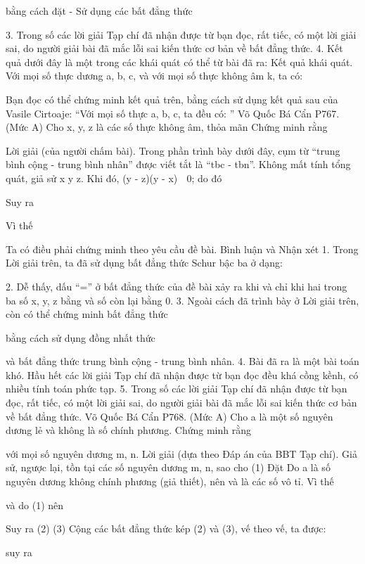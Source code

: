 \begin{multicols}{2}
	bằng cách đặt      
	- Sử dụng các bất đẳng thức
	
	
	3. Trong số các lời giải Tạp chí đã nhận được từ bạn đọc, rất tiếc, có một lời giải sai, do người giải bài đã mắc lỗi sai kiến thức cơ bản về bất đẳng thức.
	4. Kết quả dưới đây là một trong các khái quát có thể từ bài đã ra:
	Kết quả khái quát. Với mọi số thực dương a, b, c, và với mọi số thực không âm k, ta có:
	
	Bạn đọc có thể chứng minh kết quả trên, bằng cách sử dụng kết quả sau của Vasile Cirtoaje:
	“Với mọi số thực a, b, c, ta đều có:
	”
	Võ Quốc Bá Cẩn
	P767. (Mức A) Cho x, y, z là các số thực không âm, thỏa mãn   Chứng minh rằng
	
	Lời giải (của người chấm bài).
	Trong phần trình bày dưới đây, cụm từ “trung bình cộng - trung bình nhân” được viết tắt là “tbc - tbn”.
	Không mất tính tổng quát, giả sử x \ge y \ge z.
	Khi đó, (y - z)(y - x)  0; do đó
	
	Suy ra
	
	Vì thế
	
	Ta có điều phải chứng minh theo yêu cầu đề bài.
	Bình luận và Nhận xét
	1. Trong Lời giải trên, ta đã sử dụng bất đẳng thức Schur bậc ba ở dạng:
	
	2. Dễ thấy, dấu “=” ở bất đẳng thức của đề bài xảy ra khi và chỉ khi hai trong ba số x, y, z bằng   và số còn lại bằng 0.
	3. Ngoài cách đã trình bày ở Lời giải trên, còn có thể chứng minh bất đẳng thức
	
	bằng cách sử dụng đồng nhất thức
	
	và bất đẳng thức trung bình cộng - trung bình nhân.
	4. Bài đã ra là một bài toán khó. Hầu hết các lời giải Tạp chí đã nhận được từ bạn đọc đều khá cồng kềnh, có nhiều tính toán phức tạp.
	5. Trong số các lời giải Tạp chí đã nhận được từ bạn đọc, rất tiếc, có một lời giải sai, do người giải bài đã mắc lỗi sai kiến thức cơ bản về bất đẳng thức.
	Võ Quốc Bá Cẩn
	P768. (Mức A) Cho a là một số nguyên dương lẻ và không là số chính phương. Chứng minh rằng
	
	với mọi số nguyên dương m, n.
	Lời giải (dựa theo Đáp án của BBT Tạp chí).
	Giả sử, ngược lại, tồn tại các số nguyên dương m, n, sao cho
	(1)
	Đặt  
	Do a là số nguyên dương không chính phương (giả thiết), nên   và   là các số vô tỉ. Vì thế
	
	và do (1) nên
	
	Suy ra
	(2)
	(3)
	Cộng các bất đẳng thức kép (2) và (3), vế theo vế, ta được:
	
	suy ra
	

\end{multicols}
